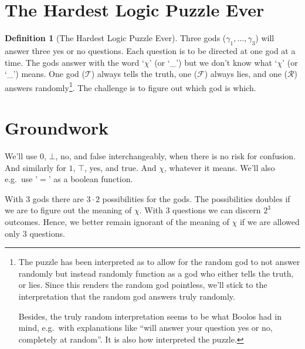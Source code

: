 \documentclass[twoside,twocolumn,a4paper,11pt]{article}
\theoremstyle{definition}
\newtheorem{defn}[theorem]{Definition}
\begin{document}
\section{The Hardest Logic Puzzle Ever}
\begin{defn}[The Hardest Logic Puzzle Ever]
\label{def:3GodsPuzzle}
Three gods ($\gamma_1,\ldots,\gamma_3$) will answer three yes or no questions. 
Each question is to be directed at one god at a time.
The gods answer with the word `$\chi$' (or `\_') but we don't know what `$\chi$' (or `\_') means.
One god ($\mathcal{T}$) always tells the truth, one ($\mathcal{F}$) always lies, 
and one ($\mathcal{R}$) answers 
randomly\footnote{The
\label{fn:R}
puzzle has been interpreted as to allow for the random god to not answer randomly but instead
randomly function as a god who either tells the truth, or lies.\cite{rab08}
Since this renders the random god pointless,
we'll stick to the interpretation that the random god answers truly randomly.

Besides, the truly random interpretation seems to be 
what 
Boolos 
had in
mind,\cite{bool96}
e.g.\ with explanations like
``will answer your question yes or no, completely at random''\cite[\hspace{-0.25em}p.\,2]{bool96}.
It is also how \cite{rob01} interpreted the puzzle.}\nolinebreak[3]\hspace{-0.17em}.
The challenge is to figure out which god is which.\cite{bool96}
\end{defn}


\section{Groundwork}
\label{sec:sol}
We'll use $0$, $\bot$, no, and false interchangeably, when there is no risk for confusion.
And similarly for $1$, $\top$, yes, and true.
And $\chi$, whatever it means.
We'll also e.g.\ use '$=$' as a boolean function.

With $3$ gods there are $3\cdot 2$ possibilities for the gods. 
The possibilities doubles if we are to figure out the meaning of $\chi$. 
With $3$ questions we can discern $2^3$ outcomes. 
Hence, we better remain 
ignorant
of the meaning of $\chi$
if we are allowed only $3$ questions.
\end{document}
